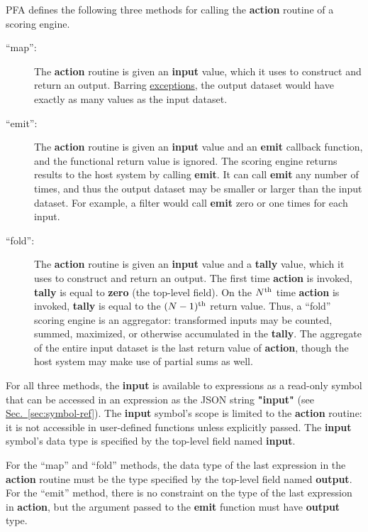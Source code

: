 \documentclass{article}
\newcommand{\PFAc}{\ttfamily\bfseries}
\newenvironment{allowedfields}%
  {\begin{center} \begin{minipage}{0.9\linewidth} \begin{description}}%
  {\end{description} \end{minipage} \end{center}}
\theoremstyle{definition}
\begin{document}
PFA defines the following three methods for calling the {\PFAc action} routine of a scoring engine.
\begin{allowedfields}
\item[``map'':] The {\PFAc action} routine is given an {\PFAc input} value, which it uses to construct and return an output.  Barring \hyperlink{hsec:exceptions}{exceptions}, the output dataset would have exactly as many values as the input dataset.
\end{allowedfields}
\begin{allowedfields}
\item[``emit'':] The {\PFAc action} routine is given an {\PFAc input} value and an {\PFAc emit} callback function, and the functional return value is ignored.  The scoring engine returns results to the host system by calling {\PFAc emit}.  It can call {\PFAc emit} any number of times, and thus the output dataset may be smaller or larger than the input dataset.  For example, a filter would call {\PFAc emit} zero or one times for each input.
\end{allowedfields}
\begin{allowedfields}
\item[``fold'':] The {\PFAc action} routine is given an {\PFAc input} value and a {\PFAc tally} value, which it uses to construct and return an output.  The first time {\PFAc action} is invoked, {\PFAc tally} is equal to {\PFAc zero} (the top-level field).  On the $N^{\mbox{\scriptsize th}}$ time {\PFAc action} is invoked, {\PFAc tally} is equal to the $(N - 1)^{\mbox{\scriptsize th}}$ return value.  Thus, a ``fold'' scoring engine is an aggregator: transformed inputs may be counted, summed, maximized, or otherwise accumulated in the {\PFAc tally}.  The aggregate of the entire input dataset is the last return value of {\PFAc action}, though the host system may make use of partial sums as well.
\end{allowedfields}

For all three methods, the {\PFAc input} is available to expressions as a read-only symbol that can be accessed in an expression as the JSON string {\PFAc "input"} (see \hyperlink{hsec:symbol-ref}{Sec.~\ref{sec:symbol-ref}}).  The {\PFAc input} symbol's scope is limited to the {\PFAc action} routine: it is not accessible in user-defined functions unless explicitly passed.  The {\PFAc input} symbol's data type is specified by the top-level field named {\PFAc input}.

For the ``map'' and ``fold'' methods, the data type of the last expression in the {\PFAc action} routine must be the type specified by the top-level field named {\PFAc output}.  For the ``emit'' method, there is no constraint on the type of the last expression in {\PFAc action}, but the argument passed to the {\PFAc emit} function must have {\PFAc output} type.
\end{document}
